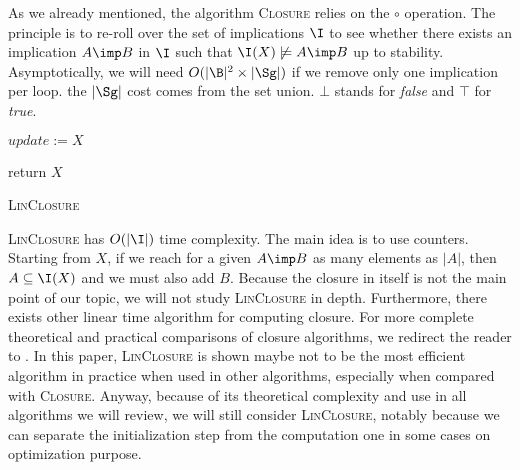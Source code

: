 As we already mentioned, the algorithm \textsc{Closure} relies on the $\circ$ 
operation. The principle is to re-roll over the set of implications $\I$ to see 
whether there exists an implication $A \imp B$ in $\I$ such that $\I(X) 
\not\models A \imp B$ up to stability. Asymptotically, we will need $O(|\B|^2 
\times |\Sg|)$ if we remove only one implication per loop. the $|\Sg|$ cost
comes from the set union. $\bot$ stands for \textit{false} and $\top$ for \textit{true}.

\vspace{1.2em}

\begin{algorithm}

\BlankLine
\BlankLine


\BlankLine

$update := X$ \;

\BlankLine


return $X$ \;

\caption{\textsc{LinClosure}}
\label{alg:linclosure}
\end{algorithm}

\textsc{LinClosure} has $O(|\I|)$ time complexity. The main idea is to use
counters. Starting from $X$, if we reach for a given $A \imp B$ as many elements
as $|A|$, then $A \subseteq \I(X)$ and we must also add $B$. Because the closure
in itself is not the main point of our topic, we will not study 
\textsc{LinClosure} in depth. Furthermore, there exists other linear time 
algorithm for computing closure. For more complete theoretical and practical 
comparisons of closure algorithms, we redirect the reader to 
\cite{bazhanov_optimizations_2014}. In this paper, \textsc{LinClosure} is 
shown maybe not to be the most efficient algorithm in practice when used in 
other algorithms, especially when compared with \textsc{Closure}. Anyway, 
because of its theoretical complexity and use in all algorithms we will review, 
we will still consider \textsc{LinClosure}, notably because we can separate the 
initialization step from the computation one in some cases on optimization 
purpose.

